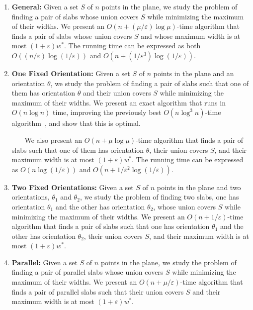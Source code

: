 \documentclass[english,a4paper, cleveref, autoref, thm-restate, nolineno]{socg-lipics-v2021}
\theoremstyle{star}
\theoremstyle{claimstar}
\newcommand{\eps}{\ensuremath{\varepsilon}}
\begin{document}
\begin{enumerate}
    \item \textbf{\textsf{General:}}
    Given a set $S$ of $n$ points in the plane, we study the problem of finding a pair of slabs whose union covers $S$ while minimizing the maximum of their widths. 
    We present an $O(n + (\mu/\eps)\log \mu )$-time algorithm that finds a pair of slabs whose union covers $S$ and whose maximum width is at most $(1+\eps)w^*$. The running time can be expressed as both $O((n/\eps)\log(1/\eps))$ and $O(n + (1/\eps^3)\log(1/\eps))$. 

    \item \textbf{\textsf{One Fixed Orientation:}} 
    Given a set $S$ of $n$ points in the plane and an orientation $\theta$, we study the problem of finding a pair of slabs such that one of them has orientation $\theta$ and their union covers $S$ while minimizing the maximum of their widths. 
    We present an exact algorithm that runs in $O(n\log n)$ time, improving the previously best $O(n\log^3 n)$-time algorithm~\cite{ahn2024constrained}, and show that this is optimal. 
    
    ~$\quad$ We also present an $O(n+ \mu \log \mu)$-time algorithm that finds a pair of slabs such that one of them has orientation $\theta$, their union covers $S$, and their maximum width is at most $(1+\eps)w^*$.
    The running time can be expressed as $O(n\log (1/\eps))$ and $O(n + 1/\eps^2 \log (1/\eps))$.

    \item \textbf{\textsf{Two Fixed Orientations:}}
    Given a set $S$ of $n$ points in the plane and two orientations, $\theta_1$ and $\theta_2$, we study the problem of finding two slabs, one has orientation $\theta_1$ and the other has orientation $\theta_2$, whose union covers $S$ while minimizing the maximum of their widths. 
    We present an $O(n+ 1/\eps)$-time algorithm that finds a pair of slabs such that 
    one has orientation $\theta_1$ and the other has orientation $\theta_2$, their union covers $S$, and their maximum width is at most $(1+\eps)w^*$.

    \item \textbf{\textsf{Parallel:}}
    Given a set $S$ of $n$ points in the plane, we study the problem of finding a pair of parallel slabs whose union covers $S$ while minimizing the maximum of their widths. 
    We present an $O(n + \mu / \eps)$-time algorithm that finds a pair of parallel slabs such that their union covers $S$ and their maximum width is at most $(1+\eps)w^*$. 
\end{enumerate}
\end{document}
